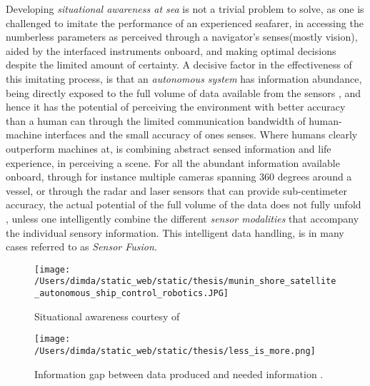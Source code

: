 Developing \emph{situational awareness at sea} is not a trivial problem to solve, as one is challenged to imitate the performance of an experienced seafarer, in accessing the numberless parameters as perceived through a navigator's senses(mostly vision), aided by the interfaced instruments onboard, and making optimal decisions despite the limited amount of certainty. A decisive factor in the effectiveness of this imitating process, is that  an \emph{autonomous system} has information abundance, being directly exposed to the full volume of data available from the sensors , and hence it has the potential of perceiving the environment with better accuracy than a human can through the limited communication bandwidth of human-machine interfaces and the small accuracy of ones senses. Where humans clearly outperform machines at, is combining abstract sensed information and life experience, in perceiving a scene. For all the abundant information available onboard, through for instance multiple cameras spanning 360 degrees around a vessel, or through the radar and laser sensors that can provide sub-centimeter accuracy, the actual potential of the full volume of the data does not  fully unfold , unless one intelligently combine the different \emph{sensor modalities} that accompany the individual sensory information. This intelligent data handling, is in many cases referred to as \emph{Sensor Fusion}.


\begin{figure}[H]
	\centering
	\texttt{[image: /Users/dimda/static\_web/static/thesis/munin\_shore\_satellite\_autonomous\_ship\_control\_robotics.JPG]}
	\caption{Situational awareness courtesy of \cite{MUNIN}}
	\label{fig:situation}
\end{figure}



\begin{figure}[H]
	\centering
	\texttt{[image: /Users/dimda/static\_web/static/thesis/less\_is\_more.png]}
	\caption{Information gap between data produced and needed information \cite{Endsley1995}.}
	\label{fig:less_is_more}
\end{figure}

